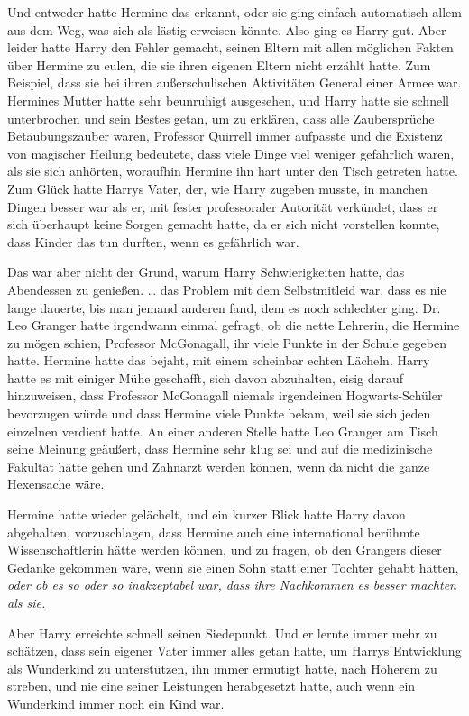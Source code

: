 {Und entweder hatte Hermine das erkannt, oder sie ging einfach automatisch allem aus dem Weg, was sich als lästig erweisen könnte. Also ging es Harry gut. Aber leider hatte Harry den Fehler gemacht, seinen Eltern mit allen möglichen Fakten über Hermine zu eulen, die sie ihren eigenen Eltern nicht erzählt hatte. Zum Beispiel, dass sie bei ihren außerschulischen Aktivitäten General einer Armee war. Hermines Mutter hatte sehr beunruhigt ausgesehen, und Harry hatte sie schnell unterbrochen und sein Bestes getan, um zu erklären, dass alle Zaubersprüche Betäubungszauber waren, Professor Quirrell immer aufpasste und die Existenz von magischer Heilung bedeutete, dass viele Dinge viel weniger gefährlich waren, als sie sich anhörten, woraufhin Hermine ihn hart unter den Tisch getreten hatte. Zum Glück hatte Harrys Vater, der, wie Harry zugeben musste, in manchen Dingen besser war als er, mit fester professoraler Autorität verkündet, dass er sich überhaupt keine Sorgen gemacht hatte, da er sich nicht vorstellen konnte, dass Kinder das tun durften, wenn es gefährlich war.

Das war aber nicht der Grund, warum Harry Schwierigkeiten hatte, das Abendessen zu genießen. … das Problem mit dem Selbstmitleid war, dass es nie lange dauerte, bis man jemand anderen fand, dem es noch schlechter ging. Dr. Leo Granger hatte irgendwann einmal gefragt, ob die nette Lehrerin, die Hermine zu mögen schien, Professor McGonagall, ihr viele Punkte in der Schule gegeben hatte. Hermine hatte das bejaht, mit einem scheinbar echten Lächeln. Harry hatte es mit einiger Mühe geschafft, sich davon abzuhalten, eisig darauf hinzuweisen, dass Professor McGonagall niemals irgendeinen Hogwarts-Schüler bevorzugen würde und dass Hermine viele Punkte bekam, weil sie sich jeden einzelnen verdient hatte. An einer anderen Stelle hatte Leo Granger am Tisch seine Meinung geäußert, dass Hermine sehr klug sei und auf die medizinische Fakultät hätte gehen und Zahnarzt werden können, wenn da nicht die ganze Hexensache wäre.

Hermine hatte wieder gelächelt, und ein kurzer Blick hatte Harry davon abgehalten, vorzuschlagen, dass Hermine auch eine international berühmte Wissenschaftlerin hätte werden können, und zu fragen, ob den Grangers dieser Gedanke gekommen wäre, wenn sie einen Sohn statt einer Tochter gehabt hätten, \emph{oder ob es so oder so inakzeptabel war, dass ihre Nachkommen es besser machten als sie.}

Aber Harry erreichte schnell seinen Siedepunkt. Und er lernte immer mehr zu schätzen, dass sein eigener Vater immer alles getan hatte, um Harrys Entwicklung als Wunderkind zu unterstützen, ihn immer ermutigt hatte, nach Höherem zu streben, und nie eine seiner Leistungen herabgesetzt hatte, auch wenn ein Wunderkind immer noch ein Kind war.

}
